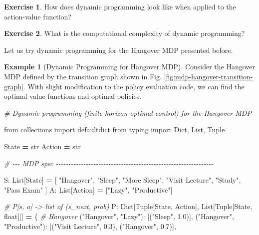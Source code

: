 \documentclass[
]{book}
\newenvironment{Shaded}{\begin{snugshade}}{\end{snugshade}}
\newcommand{\BuiltInTok}[1]{#1}
\newcommand{\CommentTok}[1]{\textcolor[rgb]{0.56,0.35,0.01}{\textit{#1}}}
\newcommand{\FloatTok}[1]{\textcolor[rgb]{0.00,0.00,0.81}{#1}}
\newcommand{\ImportTok}[1]{#1}
\newcommand{\NormalTok}[1]{#1}
\newcommand{\OperatorTok}[1]{\textcolor[rgb]{0.81,0.36,0.00}{\textbf{#1}}}
\newcommand{\StringTok}[1]{\textcolor[rgb]{0.31,0.60,0.02}{#1}}
\theoremstyle{definition}
\theoremstyle{definition}
\newtheorem{example}{Example}[chapter]
\theoremstyle{definition}
\newtheorem{exercise}{Exercise}[chapter]
\theoremstyle{definition}
\theoremstyle{remark}
\begin{document}
\begin{exercise}
How does dynamic programming look like when applied to the action-value function?
\end{exercise}

\begin{exercise}
What is the computational complexity of dynamic programming?
\end{exercise}

Let us try dynamic programming for the Hangover MDP presented before.

\begin{example}[Dynamic Programming for Hangover MDP]
\protect\hypertarget{exm:HangoverDynamicProgramming}{}\label{exm:HangoverDynamicProgramming}Consider the Hangover MDP defined by the transition graph shown in Fig. \ref{fig:mdp-hangover-transition-graph}. With slight modification to the policy evaluation code, we can find the optimal value functions and optimal policies.

\begin{Shaded}
\begin{Highlighting}[]
\CommentTok{\# Dynamic programming (finite{-}horizon optimal control) for the Hangover MDP}

\ImportTok{from}\NormalTok{ collections }\ImportTok{import}\NormalTok{ defaultdict}
\ImportTok{from}\NormalTok{ typing }\ImportTok{import}\NormalTok{ Dict, List, Tuple}

\NormalTok{State }\OperatorTok{=} \BuiltInTok{str}
\NormalTok{Action }\OperatorTok{=} \BuiltInTok{str}

\CommentTok{\# {-}{-}{-} MDP spec {-}{-}{-}{-}{-}{-}{-}{-}{-}{-}{-}{-}{-}{-}{-}{-}{-}{-}{-}{-}{-}{-}{-}{-}{-}{-}{-}{-}{-}{-}{-}{-}{-}{-}{-}{-}{-}{-}{-}{-}{-}{-}{-}{-}{-}{-}{-}{-}{-}{-}{-}{-}{-}{-}{-}{-}{-}{-}{-}{-}{-}{-}{-}}

\NormalTok{S: List[State] }\OperatorTok{=}\NormalTok{ [}
    \StringTok{"Hangover"}\NormalTok{, }\StringTok{"Sleep"}\NormalTok{, }\StringTok{"More Sleep"}\NormalTok{, }\StringTok{"Visit Lecture"}\NormalTok{, }\StringTok{"Study"}\NormalTok{, }\StringTok{"Pass Exam"}
\NormalTok{]}
\NormalTok{A: List[Action] }\OperatorTok{=}\NormalTok{ [}\StringTok{"Lazy"}\NormalTok{, }\StringTok{"Productive"}\NormalTok{]}

\CommentTok{\# P[s, a] {-}\textgreater{} list of (s\_next, prob)}
\NormalTok{P: Dict[Tuple[State, Action], List[Tuple[State, }\BuiltInTok{float}\NormalTok{]]] }\OperatorTok{=}\NormalTok{ \{}
    \CommentTok{\# Hangover}
\NormalTok{    (}\StringTok{"Hangover"}\NormalTok{, }\StringTok{"Lazy"}\NormalTok{):       [(}\StringTok{"Sleep"}\NormalTok{, }\FloatTok{1.0}\NormalTok{)],}
\NormalTok{    (}\StringTok{"Hangover"}\NormalTok{, }\StringTok{"Productive"}\NormalTok{): [(}\StringTok{"Visit Lecture"}\NormalTok{, }\FloatTok{0.3}\NormalTok{), (}\StringTok{"Hangover"}\NormalTok{, }\FloatTok{0.7}\NormalTok{)],}


\end{Highlighting}
\end{Shaded}
\end{example}
\end{document}
